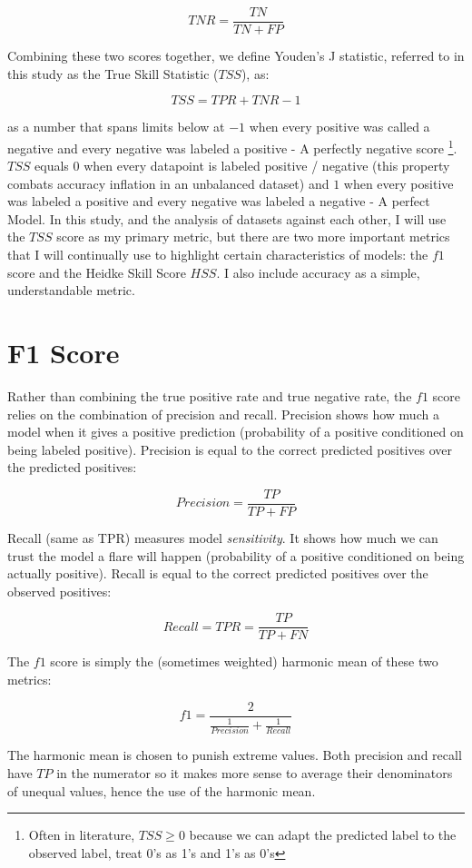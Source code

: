 $$TNR = \frac{TN}{TN + FP}$$

Combining these two scores together, we define Youden's J statistic, referred to in this study as the True Skill Statistic ($TSS$), as:

$$TSS = TPR + TNR - 1$$

as a number that spans limits below at $-1$ when every positive was called a negative and every negative was labeled a positive - A perfectly negative score \footnote{Often in literature, $TSS \geq 0$ because we can adapt the predicted label to the observed label, treat 0's as 1's and 1's as 0's}. $TSS$ equals $0$ when every datapoint is labeled positive / negative (this property combats accuracy inflation in an unbalanced dataset) and $1$ when every positive was labeled a positive and every negative was labeled a negative - A perfect Model. In this study, and the analysis of datasets against each other, I will use the $TSS$ score as my primary metric, but there are two more important metrics that I will continually use to highlight certain characteristics of models: the $f1$ score and the Heidke Skill Score $HSS$. I also include accuracy as a simple, understandable metric.


\section{F1 Score}
Rather than combining the true positive rate and true negative rate, the $f1$ score relies on the combination of precision and recall. Precision shows how much  a model when it gives a positive prediction (probability of a positive conditioned on being labeled positive). Precision is equal to the correct predicted positives over the predicted positives:

$$Precision = \frac{TP}{TP + FP}$$

Recall (same as TPR) measures model \textit{sensitivity}. It shows how much we can trust the model  a flare will happen (probability of a positive conditioned on being actually positive). Recall is equal to the correct predicted positives over the observed positives:

$$Recall = TPR = \frac{TP}{TP + FN}$$

The $f1$ score is simply the (sometimes weighted) harmonic mean of these two metrics:

$$f1 = \frac{2}{\frac{1}{Precision} + \frac{1}{Recall}}$$

The harmonic mean is chosen to punish extreme values. Both precision and recall have $TP$ in the numerator so it makes more sense to average their denominators of unequal values, hence the use of the harmonic mean.

